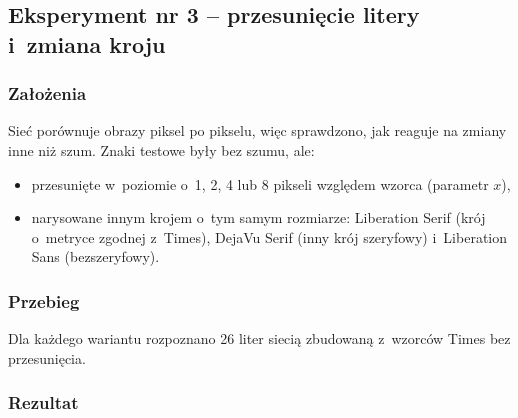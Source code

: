 \documentclass[12pt]{article}
\begin{document}
\newpage
\subsection{Eksperyment nr 3 -- przesunięcie litery i~zmiana kroju}

\subsubsection{Założenia}

Sieć porównuje obrazy piksel po pikselu, więc sprawdzono, jak reaguje na zmiany inne niż
szum. Znaki testowe były bez szumu, ale:
\begin{itemize}
 \item przesunięte w~poziomie o~1, 2, 4 lub 8 pikseli względem wzorca (parametr $x$),
 \item narysowane innym krojem o~tym samym rozmiarze: Liberation Serif (krój o~metryce
       zgodnej z~Times), DejaVu Serif (inny krój szeryfowy) i~Liberation Sans (bezszeryfowy).
\end{itemize}

\subsubsection{Przebieg}

Dla każdego wariantu rozpoznano 26 liter siecią zbudowaną z~wzorców Times bez przesunięcia.

\subsubsection{Rezultat}
\end{document}
